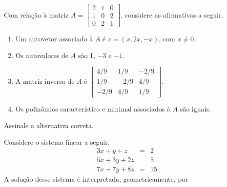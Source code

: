 \documentclass[10pt,a4paper]{article}
\begin{document}
{
\def\AMCbeginQuestion#1#2{\par\noindent{\bf (POSCOMP 2013 - Questão 02)}}
\begin{question}{} Com relação à matriz $A=\left[\begin{array}{rrr}2&1&0\\1&0&2\\0&2&1\end{array}\right]$, considere as afirmativas a seguir.
\begin{enumerate}
\item[I.] Um autovetor associado à $A$ é $v=(x,2x,-x)$, com $x\neq0$.
\item[II.] Os autovalores de $A$ são 1, $-3$ e $-1$.
\item[III.] A matriz inversa de $A$ é $\left[\begin{array}{rrr}4/9&1/9&-2/9\\1/9&-2/9&4/9\\-2/9&4/9&1/9\end{array}\right]$.
\item[IV.] Os polinômios característico e minimal associados à $A$ são iguais.
\end{enumerate}
Assinale a alternativa correta.
\begin{choices}
\end{choices}
\end{question}
}
%
{
\def\AMCbeginQuestion#1#2{\par\noindent{\bf (POSCOMP 2013 - Questão 03)}}
\begin{question}{} Considere o sistema linear a seguir.
\[
\begin{array}{rcl}3x+y+z&=&2\\5x+3y+2z&=&5\\7x+7y+8z&=&15\end{array}
\]
A solução desse sistema é interpretada, geometricamente, por
\begin{choices}
\end{choices}
\end{question}
}
\end{document}
